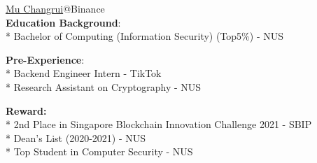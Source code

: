 \documentclass[a0,portrait]{a0poster}
\begin{document}
\begin{minipage}[b][][t]{.3\linewidth}
\vfill
\makeatletter
\raggedright{\fontsize{92pt}{100pt}\selectfont\color{binanceyellow}\textbf{{\@title}}\par}
\makeatother
\color{Black}
\vspace{1cm}
\LARGE\underline{Mu Changrui}@Binance\\
\vspace{0.2cm}
\large \textbf{Education Background}:\\
\large
* Bachelor of Computing (Information Security) (Top5\%)      - NUS
\end{minipage}%
%
\begin{minipage}[b][][t]{.3\linewidth}
\vfill
\large \textbf{Pre-Experience}:\\
\large
* Backend  Engineer Intern                                  - TikTok\\
* Research Assistant on Cryptography                - NUS
\end{minipage}
\vspace{0cm}
\begin{minipage}[b][][t]{.4\linewidth}
\vfill
\large \textbf{Reward:}\\
\large
* 2nd Place in Singapore Blockchain Innovation Challenge 2021   - SBIP\\
* Dean’s List (2020-2021)                               - NUS\\
* Top Student in Computer Security                      - NUS
\end{minipage}
\vspace{0cm}
\end{document}

